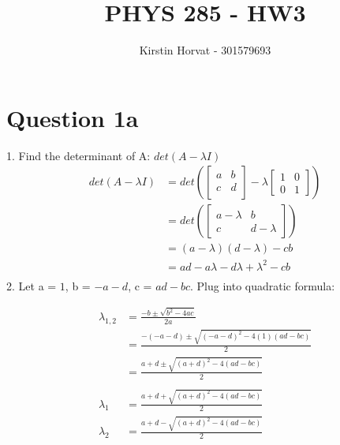 \documentclass[12pt]{article}
\title{PHYS 285 - HW3}
\author{Kirstin Horvat - 301579693}
\begin{document}
\maketitle
\onehalfspacing


\section*{Question 1a}
1. Find the determinant of A: $det(A - \lambda I)$ \\

\begin{equation}
    \begin{split}
        det(A - \lambda I) &= det\left(\begin{bmatrix} a & b \\ c & d \\ \end{bmatrix} - \lambda \begin{bmatrix} 1 & 0 \\ 0 & 1 \end{bmatrix}\right) \\
        &= det\left(\begin{bmatrix} a - \lambda & b \\ c & d - \lambda \end{bmatrix}\right) \\
        &= (a - \lambda)(d - \lambda) - cb \\
        &= ad - a\lambda - d\lambda + \lambda^2 - cb \\
    \end{split}
\end{equation}
2. Let a = $1$, b = $-a - d$, c = $ad-bc$. Plug into quadratic formula:

\begin{equation}
    \begin{split}
        \lambda_{1,2} &= \frac{-b \pm \sqrt{b^2 - 4ac}}{2a} \\
        &= \frac{-(-a - d) \pm \sqrt{(-a - d)^2 - 4(1)(ad - bc)}}{2} \\
        &= \frac{a + d \pm \sqrt{(a + d)^2 - 4(ad - bc)}}{2} \\\\
        \lambda_1 &= \frac{a + d + \sqrt{(a + d)^2 - 4(ad - bc)}}{2} \\
        \lambda_2 &= \frac{a + d - \sqrt{(a + d)^2 - 4(ad - bc)}}{2} \\
    \end{split}
\end{equation}
\newpage
\end{document}
